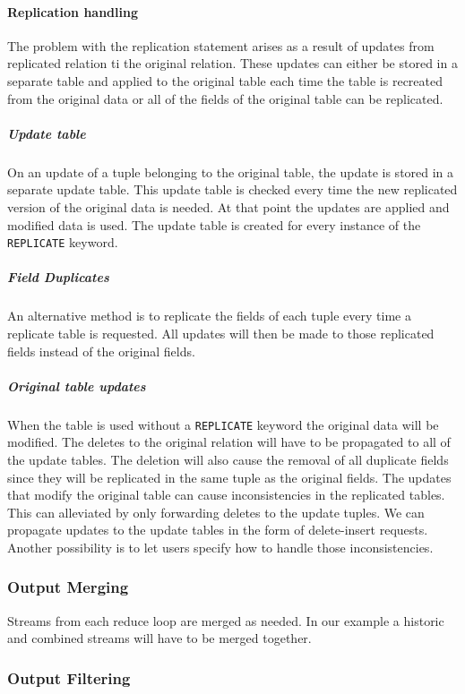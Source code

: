 \documentclass{article}
\begin{document}
\paragraph{Replication handling} The problem with the replication statement arises as a result of updates from replicated relation ti the original relation. These updates can either be stored in a separate table and applied to the original table each time the table is recreated from the original data or all of the fields of the original table can be replicated.

\subparagraph{Update table}
On an update of a tuple belonging to the original table, the update is stored in a separate update table. This update table is checked every time the new replicated version of the original data is needed. At that point the updates are applied and modified data is used. The update table is created for every instance of the {\tt REPLICATE} keyword. 

\subparagraph{Field Duplicates}
An alternative method is to replicate the fields of each tuple every time a replicate table is requested. All updates will then be made to those replicated fields instead of the original fields.

\subparagraph{Original table updates}
When the table is used without a {\tt REPLICATE} keyword the original data will be modified. The deletes to the original relation will have to be propagated to all of the update tables. The deletion will also cause the removal of all duplicate fields since they will be replicated in the same tuple as the original fields. 
The updates that modify the original table can cause inconsistencies in the replicated tables. This can alleviated by only forwarding deletes to the update tuples. We can propagate updates to the update tables in the form of delete-insert requests. Another possibility is to let users specify how to handle those inconsistencies.  

\subsubsection{Output Merging}

Streams from each reduce loop are merged as needed. In our example a historic and combined streams will have to be merged together. 

\subsubsection{Output Filtering}
\end{document}
